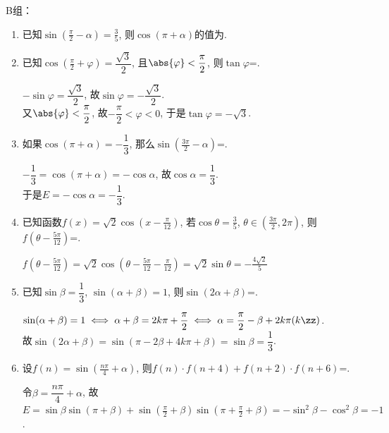 B组：
\begin{enumerate}
\item 已知$\sin(\frac{\pi}{2}-\alpha)=\frac{3}{5}$, 则$\cos(\pi+\alpha)$的值为. 

\item 已知$\cos(\frac{\pi}{2}+\varphi)=\dfrac{\sqrt3}{2}$, 且$\abs{\varphi}<\dfrac{\pi}{2}$, 则$\tan\varphi$=. 
\begin{jieda}
$-\sin\varphi=\dfrac{\sqrt{3}}{2}$, 故$\sin\varphi=-\dfrac{\sqrt{3}}{2}$. \\
又$\abs{\varphi}<\dfrac{\pi}{2}$, 故$-\dfrac{\pi}{2}<\varphi<0$, 于是$\tan\varphi=-\sqrt{3}$. 
\end{jieda}

\item 如果$\cos(\pi+\alpha)=-\dfrac{1}{3}$, 那么$\sin\left(\frac{3\pi}{2}-\alpha\right)$=. 
\begin{jieda}
$-\dfrac{1}{3}=\cos(\pi+\alpha)=-\cos\alpha$, 故$\cos\alpha=\dfrac{1}{3}$. \\
于是$E=-\cos\alpha=-\dfrac{1}{3}$. 
\end{jieda}

\item 已知函数$f(x)=\sqrt2\cos(x-\frac{\pi}{12})$, 若$\cos\theta=\frac{3}{5}$, $\theta\in(\frac{3\pi}{2},2\pi)$, 
则$f(\theta-\frac{5\pi}{12})$=. 
\begin{jieda}
$f(\theta-\frac{5\pi}{12})=\sqrt2\cos(\theta-\frac{5\pi}{12}-\frac{\pi}{12})=\sqrt{2}\sin\theta=-\frac{4\sqrt{2}}{5}$
\end{jieda}


\item 已知$\sin\beta=\dfrac{1}{3}$, $\sin(\alpha+\beta)=1$, 则$\sin(2\alpha+\beta)$=. 
\begin{jieda}
$\sin(\alpha+\beta)=1\iff\alpha+\beta=2k\pi+\dfrac{\pi}{2}\iff\alpha=\dfrac{\pi}{2}-\beta+2k\pi(k\zz)$. \\
故$\sin(2\alpha+\beta)=\sin(\pi-2\beta+4k\pi+\beta)=\sin\beta=\dfrac{1}{3}$. 
\end{jieda}


\item 设$f(n)=\sin\left(\frac{n\pi}{4}+\alpha\right)$, 则$f(n)\cdot f(n+4)+f(n+2)\cdot f(n+6)$=. 
\begin{jieda}
令$\beta=\dfrac{n\pi}{4}+\alpha$, 故$E=\sin\beta\sin(\pi+\beta)+\sin(\frac{\pi}{2}+\beta)\sin(\pi+\frac{\pi}{2}+\beta)=-\sin^2\beta-\cos^2\beta=-1$. 
\end{jieda}


\end{enumerate}

